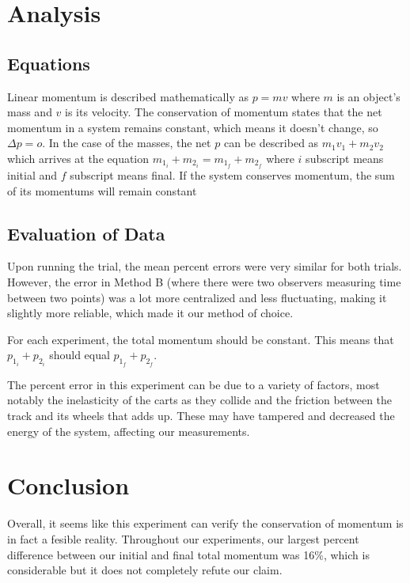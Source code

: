 \documentclass[12pt]{article}
\begin{document}
    \section{Analysis}
        \subsection{Equations}
            Linear momentum is described mathematically as $p = mv$ where $m$
            is an object's mass and $v$ is its velocity. The conservation
            of momentum states that the net momentum in a system remains
            constant, which means it doesn't change, so $\Delta p = o$. In
            the case of the masses, the net $p$ can be described as
            $m_1 v_1 + m_2 v_2$ which arrives at the equation $m_{1_i} +
            m_{2_i} = m_{1_f} + m_{2_f}$ where $i$ subscript means initial
            and $f$ subscript means final. If the system conserves momentum,
            the sum of its momentums will remain constant
        \subsection{Evaluation of Data}
            \par Upon running the trial, the mean percent errors were very similar
            for both trials. However, the error in Method B (where there were 
            two observers measuring time between two points) was a lot more
            centralized and less fluctuating, making it slightly more reliable,
            which made it our method of choice.
            \par For each experiment, the total momentum should be constant. This
            means that $p_{1_i}+ p_{2_i}$ should equal $p_{1_f} + p_{2_f}$.
            \par The percent error in this experiment can be due to a variety of
            factors, most notably the inelasticity of the carts as they collide
            and the friction between the track and its wheels that adds up. These
            may have tampered and decreased the energy of the system, affecting
            our measurements.
    \section{Conclusion}
        Overall, it seems like this experiment can verify the conservation of momentum
        is in fact a fesible reality. Throughout our experiments, our largest percent
        difference between our initial and final total momentum was 16\%, which is
        considerable but it does not completely refute our claim.
        
\end{document}
